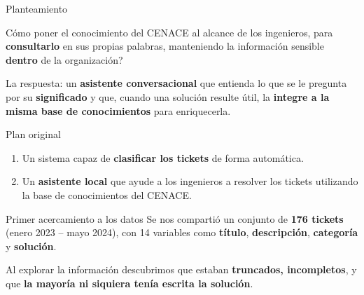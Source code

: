 \documentclass[xcolor=dvipsnames]{beamer}
\begin{document}
\begin{frame}{Planteamiento}

    \textquestiondown Cómo poner el conocimiento del CENACE al alcance de los ingenieros, para
    \textbf{consultarlo} en sus propias palabras, manteniendo la información sensible
    \textbf{dentro} de la organización?

    \bigskip
    La respuesta: un \textbf{asistente conversacional} que entienda lo que se le pregunta
    por su \textbf{significado} y que, cuando una solución resulte útil, la \textbf{integre
    a la misma base de conocimientos} para enriquecerla.

\end{frame}


\begin{frame}{Plan original}
    \begin{enumerate}
        \item Un sistema capaz de \textbf{clasificar los tickets} de forma
        automática.
        \item Un \textbf{asistente local} que ayude a los ingenieros a resolver los tickets utilizando la base de conocimientos del CENACE.
    \end{enumerate}

\end{frame}

\begin{frame}{Primer acercamiento a los datos}
    Se nos compartió un conjunto
    de \textbf{176 tickets} (enero 2023 -- mayo 2024), con 14 variables como
    \textbf{título}, \textbf{descripción}, \textbf{categoría} y \textbf{solución}.

    \bigskip
    Al explorar la información descubrimos que estaban \textbf{truncados, incompletos}, y
    que \textbf{la mayoría ni siquiera tenía escrita la solución}.
\end{frame}
\end{document}
